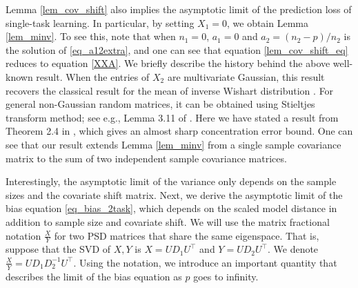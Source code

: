 Lemma \ref{lem_cov_shift} also implies the asymptotic limit of the prediction loss of single-task learning.
In particular, by setting $X_1 = 0$, we obtain Lemma \ref{lem_minv}.
To see this, note that when $n_1=0$, $a_1 = 0$ and $a_2 = (n_2-p) / n_2$ is the solution of \eqref{eq_a12extra}, and one can see that equation \eqref{lem_cov_shift_eq} reduces to equation \eqref{XXA}.
We briefly describe the history behind the above well-known result.
When the entries of $X_2$ are multivariate Gaussian, this result recovers the classical result for the mean of inverse Wishart distribution \cite{anderson1958introduction}.
For general non-Gaussian random matrices, it can be obtained using Stieltjes transform method; see e.g., Lemma 3.11 of \cite{bai2009spectral}.
Here we have stated a result from Theorem 2.4 in \cite{isotropic}, which gives an almost sharp concentration error bound.
One can see that our result extends Lemma \ref{lem_minv} from a single sample covariance matrix to the sum of two independent sample covariance matrices.

Interestingly, the asymptotic limit of the variance only depends on the sample sizes and the covariate shift matrix.
Next, we derive the asymptotic limit of the bias equation \eqref{eq_bias_2task}, which depends on the scaled model distance in addition to sample size and covariate shift. %
We will use the matrix fractional notation $\frac{X}{Y}$ for two PSD matrices that share the same eigenspace.
That is, suppose that the SVD of $X, Y$ is $X = U D_1 U^{\top}$ and $Y = U D_2 U^{\top}$.
We denote $\frac{X}{Y} = U D_{1} D_2^{-1} U^{\top}$.
Using the notation, we introduce an important quantity that describes the limit of the bias equation as $p$ goes to infinity.



